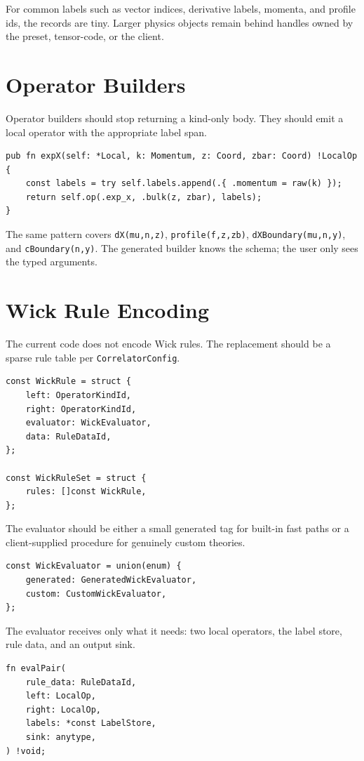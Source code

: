 \documentclass[11pt]{article}
\begin{document}
For common labels such as vector indices, derivative labels, momenta, and
profile ids, the records are tiny.  Larger physics objects remain behind
handles owned by the preset, tensor-code, or the client.
\section{Operator Builders}
\label{sec:org5e49211}

Operator builders should stop returning a kind-only body.  They should emit a
local operator with the appropriate label span.

\begin{verbatim}
pub fn expX(self: *Local, k: Momentum, z: Coord, zbar: Coord) !LocalOp {
    const labels = try self.labels.append(.{ .momentum = raw(k) });
    return self.op(.exp_x, .bulk(z, zbar), labels);
}
\end{verbatim}

The same pattern covers \texttt{dX(mu,n,z)}, \texttt{profile(f,z,zb)},
\texttt{dXBoundary(mu,n,y)}, and \texttt{cBoundary(n,y)}.  The generated builder knows the
schema; the user only sees the typed arguments.
\section{Wick Rule Encoding}
\label{sec:org9c120bc}

The current code does not encode Wick rules.  The replacement should be a
sparse rule table per \texttt{CorrelatorConfig}.

\begin{verbatim}
const WickRule = struct {
    left: OperatorKindId,
    right: OperatorKindId,
    evaluator: WickEvaluator,
    data: RuleDataId,
};

const WickRuleSet = struct {
    rules: []const WickRule,
};
\end{verbatim}

The evaluator should be either a small generated tag for built-in fast paths or
a client-supplied procedure for genuinely custom theories.

\begin{verbatim}
const WickEvaluator = union(enum) {
    generated: GeneratedWickEvaluator,
    custom: CustomWickEvaluator,
};
\end{verbatim}

The evaluator receives only what it needs: two local operators, the label
store, rule data, and an output sink.

\begin{verbatim}
fn evalPair(
    rule_data: RuleDataId,
    left: LocalOp,
    right: LocalOp,
    labels: *const LabelStore,
    sink: anytype,
) !void;
\end{verbatim}
\end{document}
